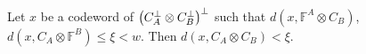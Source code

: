 %
%   
%
% 
 \begin{claim}  
   Let $x$ be a codeword of $\left( C_{A}^{\perp}\otimes C_{B}^{\perp} \right)^{\perp}$ such that $d(x, \mathbb{F}^{A} \otimes C_{B})$, $d(x, C_{A}\otimes\mathbb{F}^{B}) \le \xi < w$. Then $d(x, C_{A} \otimes C_{B}) < \xi $. 
 \end{claim} 
